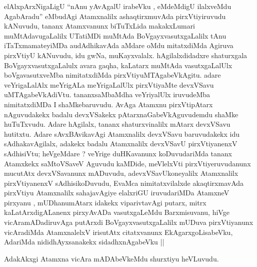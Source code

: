 \begin{center}


\end{center}


\begin{artha}
elAlxpArxNigaLigU ``nAnu yAvAgalU irabeVku , eMdeMdigU ilalxveMdu AgabAradu'' 
eMbudAgi Atamxnalilx ashaqtirxmuvAda pirxVtiyiruvudu kANuvudu, tananx
Atamxvanunx biTuTxLida makakxLumari muMtAdavugaLalilx UTatiMDi muMtAda
BoVgayxvasutxgaLalilx tAnu iTaTxmamateyiMDa audAdhikavAda aMdare oMdu
mitatxdiMda Agiruva pirxVtiyU kANuvudu, idu gwNa,
muKayxvalalx. hAgilalxdidadxre shaturxgala BoVgayxvasutxgaLalulx avara
gaqha, kaLatarx muMtAda vasutxgaLalUlx boVgavasutxveMba nimitatxdiMda
pirxVtiyuMTAgabeVkAgitu. adare veYrigaLalAlx meYrigALa meYrigaLalUlx
pirxVtiyaMte devxVSavu uMTAgabeVkAdiVtu. tananxsaMbaMdha veYriyalUlx
iruvudeMba nimitatxdiMDa I shaMkebaruvudu. AvAga Atamxnu pirxVtipAtarx
nAguvudakekx badalu devxVSakekx pAtarxnaGabeVkAguvudemdu shaMke
huTuTxvudu. Adare hAgilalx, tananx shaturxvinalilx mAtarx devxVSavu
hutitxtu. Adare sAvxBAvikavAgi Atamxnalilx devxVSavu baruvudakekx idu
sAdhakavAgilalx, adakekx badalu Atamxnalilx devxVSavU pirxVtiyanenxV
sAdhisiVtu; heVgeMdare ? veYrige duHKavanunx koDuvudariMda tananx
Atamxkekx saMtoVSaveV Aguvudu kaMDide, meVlelxVti pirxVtiyeruvudanunx
mucutAtx devxVSavanunx mADuvudu, adevxVSavUkoneyalilx Atamxnalilx
pirxVtiyanenxV sAdhisikoDuvudu, EvaMca nimitatxvilalxde akaqtirxmavAda
pirxVtiyu Atamxnalilx sahajavAgiye elalxriGU iruvudariMDa AtamxneV
pirxyanu , mUDhanumAtarx idakekx viparivtavAgi putarx, mitrx
kaLatArxdigALanenx pirxyAvADa vasutxgaLeMdu Barxmisuvanu, hiVge
vicAramADadiruvAga putArxdi BoVgayxvasutxgaLalilx mUDuva pirxVtiyanunx
vicAradiMda AtamxnalelxV irisutAtx citatxvanunx EkAgarxgoLisabeVku,
AdariMda nididhAyxsanakekx sidadhxnAgabeVku ||

AdakAkxgi Atamxna vicAra mADAbeVkeMdu shurxtiyu heVLuvudu.
\end{artha}


